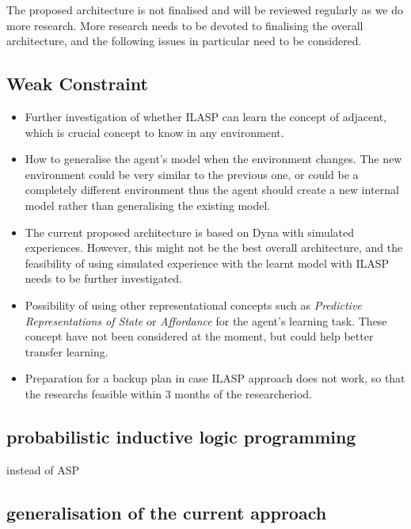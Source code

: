 \documentclass[12pt,twoside]{report}
\theoremstyle{plain}
\theoremstyle{definition}
\begin{document}
The proposed architecture is not finalised and will be reviewed regularly as we do more research.
More research needs to be devoted to finalising the overall architecture, and the following issues in particular need to be considered.

\subsection{Weak Constraint}

\begin{itemize}

\item Further investigation of whether ILASP can learn the concept of adjacent, which is crucial concept to know in any environment.
\item How to generalise the agent's model when the environment changes. The new environment could be very similar to the previous one, or could be a completely different environment thus the agent should create a new internal model rather than generalising the existing model.
\item The current proposed architecture is based on Dyna with simulated experiences. However, this might not be the best overall architecture, and the feasibility of using simulated experience with the learnt model with ILASP needs to be further investigated.

\item Possibility of using other representational concepts such as \textit{Predictive Representations of State} or \textit{Affordance} \cite{Sridharan2017} for the agent's learning task. These concept have not been considered at the moment, but could help better transfer learning.

\item Preparation for a backup plan in case ILASP approach does not work, so that the researchs feasible within 3 months of the researcheriod.

\end{itemize}

\subsection{probabilistic inductive logic programming}
instead of ASP

\subsection{generalisation of the current approach}
\end{document}
